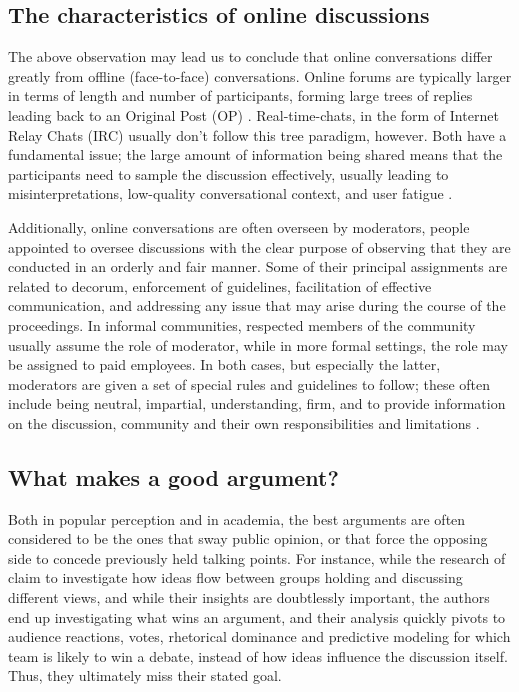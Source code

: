 \subsection{The characteristics of online discussions}
\label{sec:background:arguments-online}

The above observation may lead us to conclude that online conversations differ greatly from offline (face-to-face) conversations. Online forums are typically larger in terms of length and number of participants, forming large trees of replies leading back to an Original Post (OP) \cite{boschi2021wordunderstandingsampleonline}. Real-time-chats, in the form of Internet Relay Chats (IRC) usually don't follow this tree paradigm, however. Both have a fundamental issue; the large amount of information being shared means that the participants need to sample the discussion effectively, usually leading to misinterpretations, low-quality conversational context, and user fatigue \cite{boschi2021wordunderstandingsampleonline}. 

Additionally, online conversations are often overseen by moderators, people appointed to oversee discussions with the clear purpose of observing that they are conducted in an orderly and fair manner. Some of their principal assignments are related to decorum, enforcement of guidelines, facilitation of effective communication, and addressing any issue that may arise during the course of the proceedings. In informal communities, respected members of the community usually assume the role of moderator, while in more formal settings, the role may be assigned to paid employees. In both cases, but especially the latter, moderators are given a set of special rules and guidelines to follow; these often include being neutral, impartial, understanding, firm, and to provide information on the discussion, community and their own responsibilities and limitations \cite{Cornell_eRulemaking2017}.

\subsection{What makes a good argument?}
\label{sec:background:good-argument}

Both in popular perception and in academia, the best arguments are often considered to be the ones that sway public opinion, or that force the opposing side to concede previously held talking points. For instance, while the research of \citet{zhang2016-oxford} claim to investigate how ideas flow between groups holding and discussing different views, and while their insights are doubtlessly important, the authors end up investigating what wins an argument, and their analysis quickly pivots to audience reactions, votes, rhetorical dominance and predictive modeling for which team is likely to win a debate, instead of how ideas influence the discussion itself. Thus, they ultimately miss their stated goal.


